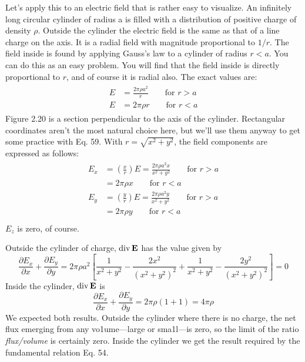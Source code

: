 Let's apply this to an electric field that is rather easy to visualize.
An infinitely long circular cylinder of radius a is filled with a distribution
of positive charge of density $\rho$. Outside the cylinder the electric
field is the same as that of a line charge on the axis. It is a radial
field with magnitude proportional to $1/r$. The field inside is found
by applying Gauss's law to a cylinder of radius $r< a$. You can do
this as an easy problem. You will find that the field inside is directly
proportional to $r$, and of course it is radial also. The exact values
are:
\begin{align}
\begin{split}
  E &= \frac{2\pi\rho a^2}{r} \qquad \text{for $r>a$} \\
  E &= 2\pi\rho r \qquad \text{for $r<a$} 
\end{split}
\end{align}
Figure 2.20 is a section perpendicular to the axis of the cylinder.
Rectangular coordinates aren't the most natural choice here, but
we'll use them anyway to get some practice with Eq. 59. With
$r=\sqrt{x^2+y^2}$, the field components are expressed as follows:
\begin{align}
\begin{split}
  E_x &= \left(\frac{x}{r}\right)E = \frac{2\pi\rho a^2 x}{x^2+y^2} \qquad \text{for $r>a$} \\
      &= 2\pi\rho x \qquad \text{for $r<a$} \\
  E_y &= \left(\frac{y}{r}\right)E = \frac{2\pi\rho a^2 y}{x^2+y^2} \qquad \text{for $r>a$} \\
      &= 2\pi\rho y \qquad \text{for $r<a$} \\
\end{split}
\end{align}
$E_z$ is zero, of course.

Outside the cylinder of charge, $\operatorname{div}\mathbf{E}$ has the value given by
\begin{equation}
  \frac{\partial E_x}{\partial x}+\frac{\partial E_y}{\partial y}
       = 2\pi\rho a^2\left[
           \frac{1}{x^2+y^2}-\frac{2x^2}{(x^2+y^2)^2}
                 +\frac{1}{x^2+y^2}-\frac{2y^2}{(x^2+y^2)^2}
         \right] = 0
\end{equation}
Inside the cylinder, $\operatorname{div}\mathbf{E}$ is
\begin{equation}
  \frac{\partial E_x}{\partial x}+\frac{\partial E_y}{\partial y}
        =2\pi\rho(1+1)=4\pi\rho
\end{equation}
We expected both results. Outside the cylinder where there is no
charge, the net flux emerging from any vo1ume---large or sma1l---is
zero, so the limit of the ratio \emph{flux/volume} is certainly zero. Inside the
cylinder we get the result required by the fundamental relation Eq. 54.

